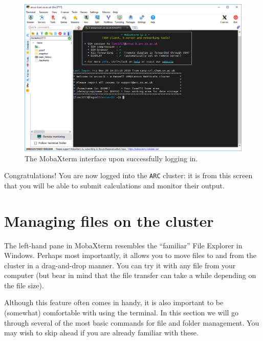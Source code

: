 \documentclass[10pt]{article}
\begin{document}
\begin{figure}[H]
    \centering
    \includegraphics[scale=0.38]{./img/loggedin}
    \caption{The MobaXterm interface upon successfully logging in.}
    \label{fig:loggedin}
\end{figure}


Congratulations! You are now logged into the \texttt{ARC} cluster: it is from this screen that you will be able to submit calculations and monitor their output.

\section{Managing files on the cluster}

The left-hand pane in MobaXterm resembles the ``familiar'' File Explorer in Windows. Perhaps most importantly, it allows you to move files to and from the cluster in a drag-and-drop manner. You can try it with any file from your computer (but bear in mind that the file transfer can take a while depending on the file size).

Although this feature often comes in handy, it is also important to be (somewhat) comfortable with using the terminal. In this section we will go through several of the most basic commands for file and folder management. You may wish to skip ahead if you are already familiar with these.
\end{document}
